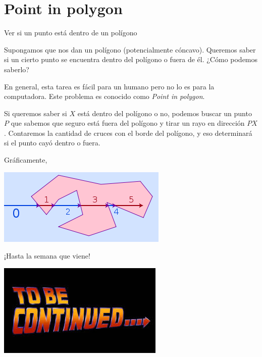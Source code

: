 \documentclass[compress]{beamer}
\begin{document}
\section{Point in polygon}
\begin{frame}{Ver si un punto está dentro de un polígono}

Supongamos que nos dan un polígono (potencialmente cóncavo). Queremos
saber si un cierto punto se encuentra dentro del polígono o fuera de él.
¿Cómo podemos saberlo? 

En general, esta tarea es fácil para un humano pero no lo es para la
computadora. Este problema es conocido como \textit{Point in polygon}. 
\end{frame}

\begin{frame}
Si queremos saber si $X$ está dentro del polígono o no, podemos
buscar un punto $P$ que sabemos que seguro está fuera del polígono
y tirar un rayo en dirección $PX$. Contaremos la cantidad de cruces con
el borde del polígono, y eso determinará si el punto cayó dentro o fuera.

Gráficamente,

\begin{center}
\includegraphics[scale=0.6]{images/point_in_poly.png}
\end{center}

\end{frame}

\begin{frame}{¡Hasta la semana que viene!}
\begin{center}
\includegraphics[scale=0.7]{images/to_be_continued.jpg}
\end{center}
\end{frame}
\end{document}
